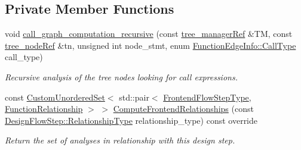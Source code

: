 \subsection*{Private Member Functions}
\begin{DoxyCompactItemize}
\item 
void \hyperlink{classcall__graph__computation_aa08581de981bf5549768d841274af95c}{call\+\_\+graph\+\_\+computation\+\_\+recursive} (const \hyperlink{tree__manager_8hpp_a96ff150c071ce11a9a7a1e40590f205e}{tree\+\_\+manager\+Ref} \&TM, const \hyperlink{tree__node_8hpp_a6ee377554d1c4871ad66a337eaa67fd5}{tree\+\_\+node\+Ref} \&tn, unsigned int node\+\_\+stmt, enum \hyperlink{structFunctionEdgeInfo_a39413ce8498ca68ed43c3f171f2607ef}{Function\+Edge\+Info\+::\+Call\+Type} call\+\_\+type)
\begin{DoxyCompactList}\small\item\em Recursive analysis of the tree nodes looking for call expressions. \end{DoxyCompactList}\item 
const \hyperlink{classCustomUnorderedSet}{Custom\+Unordered\+Set}$<$ std\+::pair$<$ \hyperlink{frontend__flow__step_8hpp_afeb3716c693d2b2e4ed3e6d04c3b63bb}{Frontend\+Flow\+Step\+Type}, \hyperlink{classFrontendFlowStep_af7cf30f2023e5b99e637dc2058289ab0}{Function\+Relationship} $>$ $>$ \hyperlink{classcall__graph__computation_a65af3a72351009e38a143bd50b60bb21}{Compute\+Frontend\+Relationships} (const \hyperlink{classDesignFlowStep_a723a3baf19ff2ceb77bc13e099d0b1b7}{Design\+Flow\+Step\+::\+Relationship\+Type} relationship\+\_\+type) const override
\begin{DoxyCompactList}\small\item\em Return the set of analyses in relationship with this design step. \end{DoxyCompactList}\end{DoxyCompactItemize}
